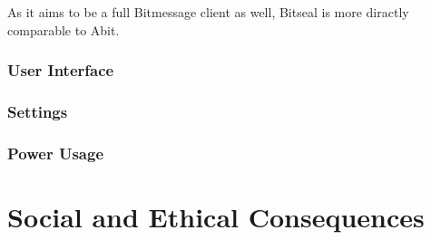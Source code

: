 \documentclass{bfh}
\begin{document}
  As it aims to be a full Bitmessage client as well, Bitseal is more diractly comparable to Abit.

  \subsubsection{User Interface}
  \subsubsection{Settings}
  \subsubsection{Power Usage}








  \newpage
  \section{Social and Ethical Consequences}
  












  \newpage
  
  
\end{document}
